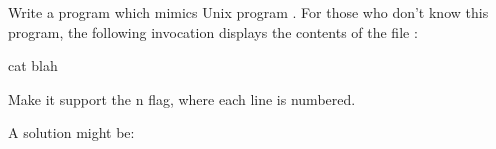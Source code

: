 \begin{Exercise}[title={Cat},difficulty=6]
\label{ex:cat}
\Question \label{ex:cat q1} Write a program which mimics Unix program
. For those who don't know this program, the following 
invocation displays the contents of the file :
\begin{display}
\pr cat blah
\end{display}

\Question Make it support the \-n flag, where each line is
numbered.

\end{Exercise}

\begin{Answer}

\Question A solution might be:


\end{Answer}
